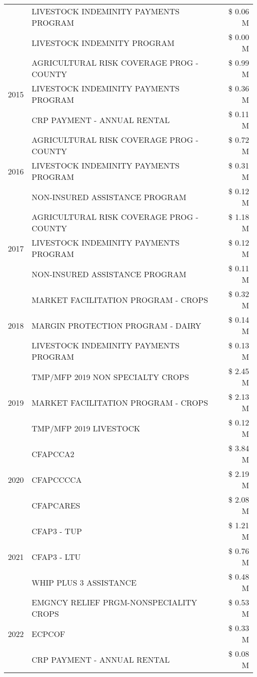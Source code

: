 \begin{tabular}{llr}
 & LIVESTOCK INDEMINITY PAYMENTS PROGRAM & \$ 0.06 M \\
 & LIVESTOCK INDEMNITY PROGRAM & \$ 0.00 M \\
\cline{1-3}
\multirow[t]{3}{*}{2015} & AGRICULTURAL RISK COVERAGE PROG - COUNTY & \$ 0.99 M \\
 & LIVESTOCK INDEMINITY PAYMENTS PROGRAM & \$ 0.36 M \\
 & CRP PAYMENT - ANNUAL RENTAL & \$ 0.11 M \\
\cline{1-3}
\multirow[t]{3}{*}{2016} & AGRICULTURAL RISK COVERAGE PROG - COUNTY & \$ 0.72 M \\
 & LIVESTOCK INDEMINITY PAYMENTS PROGRAM & \$ 0.31 M \\
 & NON-INSURED ASSISTANCE PROGRAM & \$ 0.12 M \\
\cline{1-3}
\multirow[t]{3}{*}{2017} & AGRICULTURAL RISK COVERAGE PROG - COUNTY & \$ 1.18 M \\
 & LIVESTOCK INDEMINITY PAYMENTS PROGRAM & \$ 0.12 M \\
 & NON-INSURED ASSISTANCE PROGRAM & \$ 0.11 M \\
\cline{1-3}
\multirow[t]{3}{*}{2018} & MARKET FACILITATION PROGRAM - CROPS & \$ 0.32 M \\
 & MARGIN PROTECTION PROGRAM - DAIRY & \$ 0.14 M \\
 & LIVESTOCK INDEMINITY PAYMENTS PROGRAM & \$ 0.13 M \\
\cline{1-3}
\multirow[t]{3}{*}{2019} & TMP/MFP 2019 NON SPECIALTY CROPS & \$ 2.45 M \\
 & MARKET FACILITATION PROGRAM - CROPS & \$ 2.13 M \\
 & TMP/MFP 2019 LIVESTOCK & \$ 0.12 M \\
\cline{1-3}
\multirow[t]{3}{*}{2020} & CFAPCCA2 & \$ 3.84 M \\
 & CFAPCCCCA & \$ 2.19 M \\
 & CFAPCARES & \$ 2.08 M \\
\cline{1-3}
\multirow[t]{3}{*}{2021} & CFAP3 - TUP & \$ 1.21 M \\
 & CFAP3 - LTU & \$ 0.76 M \\
 & WHIP PLUS 3 ASSISTANCE & \$ 0.48 M \\
\cline{1-3}
\multirow[t]{3}{*}{2022} & EMGNCY RELIEF PRGM-NONSPECIALITY CROPS & \$ 0.53 M \\
 & ECPCOF & \$ 0.33 M \\
 & CRP PAYMENT - ANNUAL RENTAL & \$ 0.08 M \\
\cline{1-3}
\bottomrule
\end{tabular}
